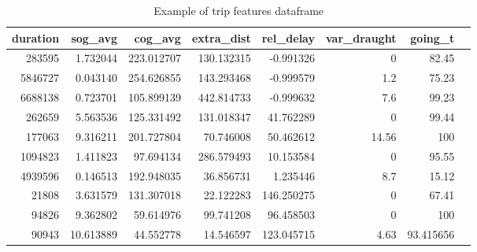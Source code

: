 \begin{table}[H]
\centering
\begin{tabular}{|r|r|r|r|r|r|r|r|}
\hline
\textbf{duration} & \textbf{sog\_avg} & \textbf{cog\_avg} & \textbf{extra\_dist} & \textbf{rel\_delay} & \textbf{var\_draught} & \textbf{going\_t} \\
\hline
283595 & 1.732044 & 223.012707 & 130.132315 & -0.991326 & 0 & 82.45 \\
5846727 & 0.043140 & 254.626855 & 143.293468 & -0.999579 & 1.2 & 75.23 \\
6688138 & 0.723701 & 105.899139 & 442.814733 & -0.999632 & 7.6 & 99.23 \\
262659 & 5.563536 & 125.331492 & 131.018347 & 41.762289 & 0 & 99.44 \\
177063 & 9.316211 & 201.727804 & 70.746008 & 50.462612 & 14.56 & 100 \\
1094823 & 1.411823 & 97.694134 & 286.579493 & 10.153584 & 0 & 95.55 \\
4939596 & 0.146513 & 192.948035 & 36.856731 & 1.235446 & 8.7 & 15.12 \\
21808 & 3.631579 & 131.307018 & 22.122283 & 146.250275 & 0 & 67.41 \\
94826 & 9.362802 & 59.614976 & 99.741208 & 96.458503 & 0 & 100 \\
90943 & 10.613889 & 44.552778 & 14.546597 & 123.045715 & 4.63 & 93.415656 \\
\hline
\end{tabular}
\caption{Example of trip features dataframe}
\end{table}

